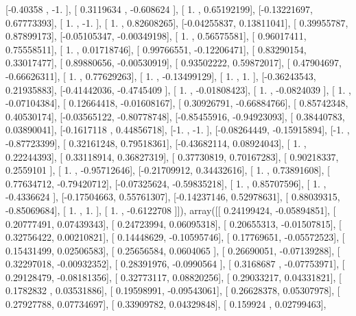 \documentclass{article}
\begin{document}
       [-0.40358   , -1.        ],
       [ 0.3119634 , -0.608624  ],
       [ 1.        ,  0.65192199],
       [-0.13221697,  0.67773393],
       [ 1.        , -1.        ],
       [ 1.        ,  0.82608265],
       [-0.04255837,  0.13811041],
       [ 0.39955787,  0.87899173],
       [-0.05105347, -0.00349198],
       [ 1.        ,  0.56575581],
       [ 0.96017411,  0.75558511],
       [ 1.        ,  0.01718746],
       [ 0.99766551, -0.12206471],
       [ 0.83290154,  0.33017477],
       [ 0.89880656, -0.00530919],
       [ 0.93502222,  0.59872017],
       [ 0.47904697, -0.66626311],
       [ 1.        ,  0.77629263],
       [ 1.        , -0.13499129],
       [ 1.        ,  1.        ],
       [-0.36243543,  0.21935883],
       [-0.41442036, -0.4745409 ],
       [ 1.        , -0.01808423],
       [ 1.        , -0.0824039 ],
       [ 1.        , -0.07104384],
       [ 0.12664418, -0.01608167],
       [ 0.30926791, -0.66884766],
       [ 0.85742348,  0.40530174],
       [-0.03565122, -0.80778748],
       [-0.85455916, -0.94923093],
       [ 0.38440783,  0.03890041],
       [-0.1617118 ,  0.44856718],
       [-1.        , -1.        ],
       [-0.08264449, -0.15915894],
       [-1.        , -0.87723399],
       [ 0.32161248,  0.79518361],
       [-0.43682114,  0.08924043],
       [ 1.        ,  0.22244393],
       [ 0.33118914,  0.36827319],
       [ 0.37730819,  0.70167283],
       [ 0.90218337,  0.2559101 ],
       [ 1.        , -0.95712646],
       [-0.21709912,  0.34432616],
       [ 1.        ,  0.73891608],
       [ 0.77634712, -0.79420712],
       [-0.07325624, -0.59835218],
       [ 1.        ,  0.85707596],
       [ 1.        , -0.4336624 ],
       [-0.17504663,  0.55761307],
       [-0.14237146,  0.52978631],
       [ 0.88039315, -0.85069684],
       [ 1.        ,  1.        ],
       [ 1.        , -0.6122708 ]]), array([[ 0.24199424, -0.05894851],
       [ 0.20777491,  0.07439343],
       [ 0.24723994,  0.06095318],
       [ 0.20655313, -0.01507815],
       [ 0.32756422,  0.00210821],
       [ 0.14448629, -0.10595746],
       [ 0.17769651, -0.05572523],
       [ 0.15431499,  0.02506583],
       [ 0.25656584,  0.0604065 ],
       [ 0.26690051, -0.07139288],
       [ 0.32297018, -0.00932352],
       [ 0.28391976, -0.0990564 ],
       [ 0.3168687 , -0.07753971],
       [ 0.29128479, -0.08181356],
       [ 0.32773117,  0.08820256],
       [ 0.29033217,  0.04331821],
       [ 0.1782832 ,  0.03531886],
       [ 0.19598991, -0.09543061],
       [ 0.26628378,  0.05307978],
       [ 0.27927788,  0.07734697],
       [ 0.33909782,  0.04329848],
       [ 0.159924  ,  0.02799463],
\end{document}
